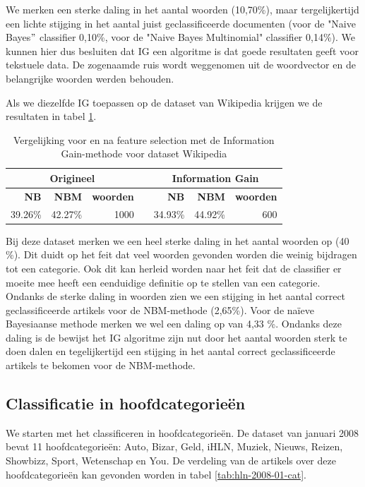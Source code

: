 We merken een sterke daling in het aantal woorden (10,70\%), maar tergelijkertijd een lichte stijging in het aantal juist geclassificeerde documenten (voor de "Naive Bayes$"$ classifier 0,10\%, voor de "Naive Bayes Multinomial" classifier 0,14\%).  We kunnen hier dus besluiten dat IG een algoritme is dat goede resultaten geeft voor tekstuele data. De zogenaamde ruis wordt weggenomen uit de woordvector en de belangrijke woorden werden behouden.

Als we diezelfde IG toepassen op de dataset van Wikipedia krijgen we de resultaten in tabel \ref{tab:feature-selection-wiki}.

\begin{table}[htbp]
	\centering
	\caption{Vergelijking voor en na feature selection met de Information Gain-methode voor dataset Wikipedia}
	\begin{tabular}{rrrrrrr}
		\toprule
		\multicolumn{3}{c}{\textbf{Origineel}} & \multicolumn{1}{c|}{\textbf{}} & \multicolumn{3}{c}{\textbf{Information Gain}} \\
		\midrule
		\textbf{NB} & \textbf{NBM} & \textbf{woorden}    &   \multicolumn{1}{c|}{}   & \textbf{NB} & \textbf{NBM} & \textbf{woorden} \\
		39.26\% & 42.27\% & 1000  &   \multicolumn{1}{c|}{}    & 34.93\% & 44.92\% & 600 \\
		\bottomrule
	\end{tabular}%
	\label{tab:feature-selection-wiki}%
\end{table}%

Bij deze dataset merken we een heel sterke daling in het aantal woorden op (40 \%). Dit duidt op het feit dat veel woorden gevonden worden die weinig bijdragen tot een categorie. Ook dit kan herleid worden naar het feit dat de classifier er moeite mee heeft een eenduidige definitie op te stellen van een categorie. Ondanks de sterke daling in woorden zien we een stijging in het aantal correct geclassificeerde artikels voor de NBM-methode (2,65\%). Voor de naïeve Bayesiaanse methode merken we wel een daling op van 4,33 \%. Ondanks deze daling is de bewijst het IG algoritme zijn nut door het aantal woorden sterk te doen dalen en tegelijkertijd een stijging in het aantal correct geclassificeerde artikels te bekomen voor de NBM-methode.

\subsection{Classificatie in hoofdcategorie\"en}
We starten met het classificeren in hoofdcategorie\"en. De dataset van januari 2008 bevat 11 hoofdcategorie\"en: Auto, Bizar, Geld, iHLN, Muziek, Nieuws, Reizen, Showbizz, Sport, Wetenschap en You. De verdeling van de artikels over deze hoofdcategorie\"en kan gevonden worden in tabel \ref{tab:hln-2008-01-cat}.

